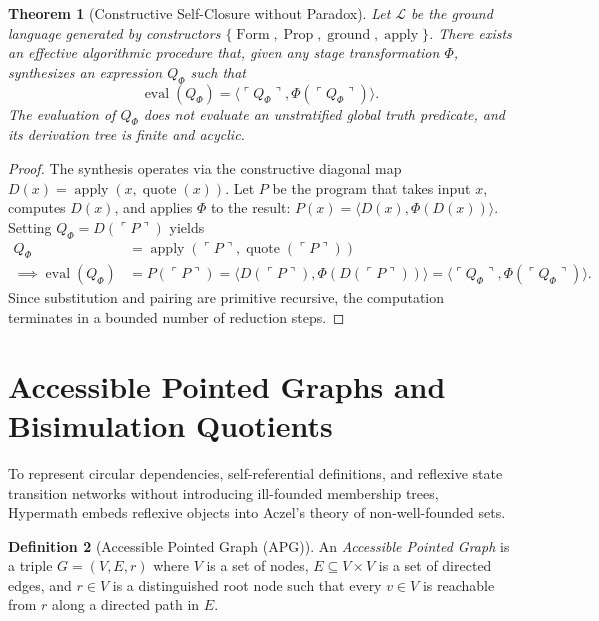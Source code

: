 \documentclass[11pt]{article}
\newtheorem{theorem}{Theorem}[section]
\theoremstyle{definition}
\newtheorem{definition}[theorem]{Definition}
\newcommand{\code}[1]{\ulcorner #1\urcorner}
\begin{document}
\begin{theorem}[Constructive Self-Closure without Paradox]
Let $\mathcal{L}$ be the ground language generated by constructors $\{\operatorname{Form}, \operatorname{Prop}, \operatorname{ground}, \operatorname{apply}\}$. There exists an effective algorithmic procedure that, given any stage transformation $\Phi$, synthesizes an expression $Q_\Phi$ such that
\[
\operatorname{eval}(Q_\Phi) = \langle \code{Q_\Phi}, \Phi(\code{Q_\Phi}) \rangle.
\]
The evaluation of $Q_\Phi$ does not evaluate an unstratified global truth predicate, and its derivation tree is finite and acyclic.
\end{theorem}
\begin{proof}
The synthesis operates via the constructive diagonal map $D(x) = \operatorname{apply}(x, \operatorname{quote}(x))$. Let $P$ be the program that takes input $x$, computes $D(x)$, and applies $\Phi$ to the result: $P(x) = \langle D(x), \Phi(D(x)) \rangle$. Setting $Q_\Phi = D(\code{P})$ yields
\begin{align*}
Q_\Phi &= \operatorname{apply}(\code{P}, \operatorname{quote}(\code{P})) \\
\implies \operatorname{eval}(Q_\Phi) &= P(\code{P}) = \langle D(\code{P}), \Phi(D(\code{P})) \rangle = \langle \code{Q_\Phi}, \Phi(\code{Q_\Phi}) \rangle.
\end{align*}
Since substitution and pairing are primitive recursive, the computation terminates in a bounded number of reduction steps.
\end{proof}

\section{Accessible Pointed Graphs and Bisimulation Quotients}
To represent circular dependencies, self-referential definitions, and reflexive state transition networks without introducing ill-founded membership trees, Hypermath embeds reflexive objects into Aczel's theory of non-well-founded sets.

\begin{definition}[Accessible Pointed Graph (APG)]
An \emph{Accessible Pointed Graph} is a triple $G = (V, E, r)$ where $V$ is a set of nodes, $E \subseteq V \times V$ is a set of directed edges, and $r \in V$ is a distinguished root node such that every $v \in V$ is reachable from $r$ along a directed path in $E$.
\end{definition}
\end{document}
